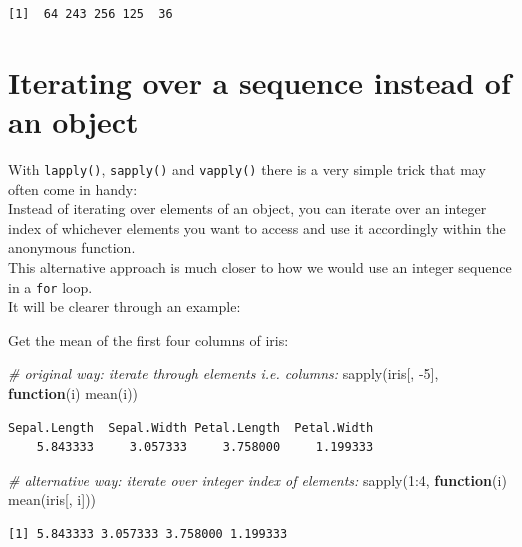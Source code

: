 \documentclass[
]{book}
\newenvironment{Shaded}{\begin{snugshade}}{\end{snugshade}}
\newcommand{\CommentTok}[1]{\textcolor[rgb]{0.56,0.35,0.01}{\textit{#1}}}
\newcommand{\ControlFlowTok}[1]{\textcolor[rgb]{0.13,0.29,0.53}{\textbf{#1}}}
\newcommand{\DecValTok}[1]{\textcolor[rgb]{0.00,0.00,0.81}{#1}}
\newcommand{\FunctionTok}[1]{\textcolor[rgb]{0.00,0.00,0.00}{#1}}
\newcommand{\NormalTok}[1]{#1}
\newcommand{\SpecialCharTok}[1]{\textcolor[rgb]{0.00,0.00,0.00}{#1}}
\begin{document}
\begin{verbatim}
[1]  64 243 256 125  36
\end{verbatim}

\hypertarget{iterating-over-a-sequence-instead-of-an-object}{%
\section{Iterating over a sequence instead of an object}\label{iterating-over-a-sequence-instead-of-an-object}}

With \texttt{lapply()}, \texttt{sapply()} and \texttt{vapply()} there is a very simple trick that may often come in handy:\\
Instead of iterating over elements of an object, you can iterate over an integer index of whichever elements you want to access and use it accordingly within the anonymous function.\\
This alternative approach is much closer to how we would use an integer sequence in a \texttt{for} loop.\\
It will be clearer through an example:

Get the mean of the first four columns of iris:

\begin{Shaded}
\begin{Highlighting}[]
\CommentTok{\# original way: iterate through elements i.e. columns:}
\FunctionTok{sapply}\NormalTok{(iris[, }\SpecialCharTok{{-}}\DecValTok{5}\NormalTok{], }\ControlFlowTok{function}\NormalTok{(i) }\FunctionTok{mean}\NormalTok{(i))}
\end{Highlighting}
\end{Shaded}

\begin{verbatim}
Sepal.Length  Sepal.Width Petal.Length  Petal.Width 
    5.843333     3.057333     3.758000     1.199333 
\end{verbatim}

\begin{Shaded}
\begin{Highlighting}[]
\CommentTok{\# alternative way: iterate over integer index of elements:}
\FunctionTok{sapply}\NormalTok{(}\DecValTok{1}\SpecialCharTok{:}\DecValTok{4}\NormalTok{, }\ControlFlowTok{function}\NormalTok{(i) }\FunctionTok{mean}\NormalTok{(iris[, i]))}
\end{Highlighting}
\end{Shaded}

\begin{verbatim}
[1] 5.843333 3.057333 3.758000 1.199333
\end{verbatim}
\end{document}
